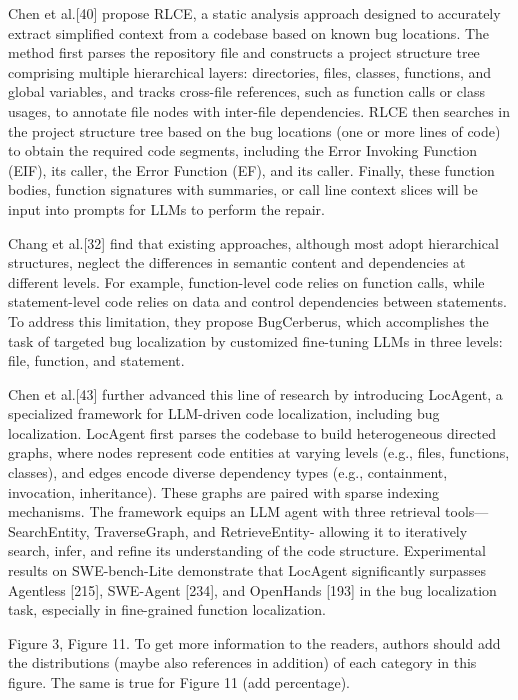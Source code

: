 \documentclass[acmsmall]{acmart}
\begin{document}
	Chen et al.[40] propose RLCE, a static analysis approach designed to accurately extract
	simplified context from a codebase based on known bug locations. The method first parses the repository
	file and constructs a project structure tree comprising multiple hierarchical layers:
	directories, files, classes, functions, and global variables, and tracks cross-file references,
	such as function calls or class usages, to annotate file nodes with inter-file dependencies.
	RLCE then searches in the project structure tree based on the bug locations (one or more lines of
	code) to obtain the required code segments, including the Error Invoking Function (EIF), its
	caller, the Error Function (EF), and its caller. Finally, these function bodies, function signatures
	with summaries, or call line context slices will be input into prompts for LLMs to perform the
	repair.

	Chang et al.[32] find that existing approaches, although most adopt hierarchical structures,
	neglect the differences in semantic content and dependencies at different levels. For example,
	function-level code relies on function calls, while statement-level code relies on data and control
	dependencies between statements. To address this limitation, they propose BugCerberus, which
	accomplishes the task of targeted bug localization by customized fine-tuning LLMs in three
	levels: file, function, and statement.

	Chen et al.[43] further advanced this line of research by introducing LocAgent, a specialized
	framework for LLM-driven code localization, including bug localization. LocAgent first parses
	the codebase to build heterogeneous directed graphs, where nodes represent code entities at varying
	levels (e.g., files, functions, classes), and edges encode diverse dependency types (e.g., containment,
	invocation, inheritance). These graphs are paired with sparse indexing mechanisms. The framework
	equips an LLM agent with three retrieval tools—SearchEntity, TraverseGraph, and RetrieveEntity- allowing
	it to iteratively search, infer, and refine its understanding of the code structure.
	Experimental results on SWE-bench-Lite demonstrate that LocAgent significantly surpasses
	Agentless [215], SWE-Agent [234], and OpenHands [193] in the bug localization task, especially in
	fine-grained function localization.
	\color{black}

	\begin{tcolorbox}
		[commentbox,title=Reviewer \#2 - Comment 6] Figure 3, Figure 11. To get more information to the
		readers, authors should add the distributions (maybe also references in addition) of each
		category in this figure. The same is true for Figure 11 (add percentage).
	\end{tcolorbox}
\end{document}
